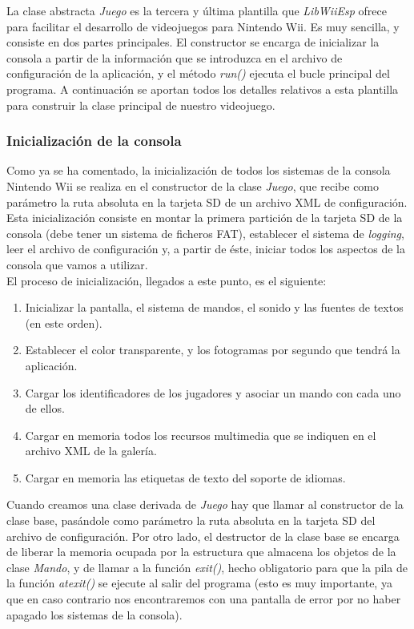 
La clase abstracta \emph{Juego} es la tercera y última plantilla que \emph{LibWiiEsp} ofrece para facilitar el desarrollo de videojuegos para Nintendo Wii. Es muy sencilla, y consiste en dos partes principales. El constructor se encarga de inicializar la consola a partir de la información que se introduzca en el archivo de configuración de la aplicación, y el método \emph{run()} ejecuta el bucle principal del programa. A continuación se aportan todos los detalles relativos a esta plantilla para construir la clase principal de nuestro videojuego.

\subsubsection{Inicialización de la consola}

Como ya se ha comentado, la inicialización de todos los sistemas de la consola Nintendo Wii se realiza en el constructor de la clase \emph{Juego}, que recibe como parámetro la ruta absoluta en la tarjeta SD de un archivo XML de configuración. Esta inicialización consiste en montar la primera partición de la tarjeta SD de la consola (debe tener un sistema de ficheros FAT), establecer el sistema de \emph{logging}, leer el archivo de configuración y, a partir de éste, iniciar todos los aspectos de la consola que vamos a utilizar.\\

El proceso de inicialización, llegados a este punto, es el siguiente:

\begin{enumerate}
\item Inicializar la pantalla, el sistema de mandos, el sonido y las fuentes de textos (en este orden).
\item Establecer el color transparente, y los fotogramas por segundo que tendrá la aplicación.
\item Cargar los identificadores de los jugadores y asociar un mando con cada uno de ellos.
\item Cargar en memoria todos los recursos multimedia que se indiquen en el archivo XML de la galería.
\item Cargar en memoria las etiquetas de texto del soporte de idiomas.
\end{enumerate}

Cuando creamos una clase derivada de \emph{Juego} hay que llamar al constructor de la clase base, pasándole como parámetro la ruta absoluta en la tarjeta SD del archivo de configuración. Por otro lado, el destructor de la clase base se encarga de liberar la memoria ocupada por la estructura que almacena los objetos de la clase \emph{Mando}, y de llamar a la función \emph{exit()}, hecho obligatorio para que la pila de la función \emph{atexit()} se ejecute al salir del programa (esto es muy importante, ya que en caso contrario nos encontraremos con una pantalla de error por no haber apagado los sistemas de la consola).\\

